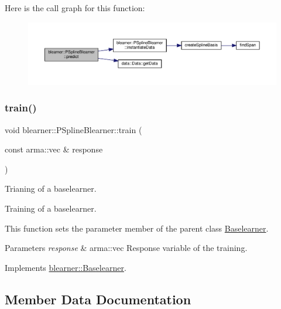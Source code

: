 Here is the call graph for this function\+:\nopagebreak
\begin{figure}[H]
\begin{center}
\leavevmode
\includegraphics[width=350pt]{classblearner_1_1_p_spline_blearner_a9d35aeb36c403c167fb7519379825873_cgraph}
\end{center}
\end{figure}
\mbox{\label{classblearner_1_1_p_spline_blearner_aa5c18ceb8396ffce556588486d574be8}} 
\subsubsection{\texorpdfstring{train()}{train()}}
{\footnotesize\ttfamily void blearner\+::\+P\+Spline\+Blearner\+::train (\begin{DoxyParamCaption}\item[{const arma\+::vec \&}]{response }\end{DoxyParamCaption})\hspace{0.3cm}{\ttfamily [virtual]}}



Trianing of a baselearner. 

Training of a baselearner.

This function sets the {\ttfamily parameter} member of the parent class {\ttfamily \mbox{\hyperlink{classblearner_1_1_baselearner}{Baselearner}}}.


\begin{DoxyParams}{Parameters}
{\em response} & {\ttfamily arma\+::vec} Response variable of the training. \\
\hline
\end{DoxyParams}


Implements \mbox{\hyperlink{classblearner_1_1_baselearner_a40e03ad070b9a03aae706d9ee8094b80}{blearner\+::\+Baselearner}}.



\subsection{Member Data Documentation}
\mbox{\label{classblearner_1_1_p_spline_blearner_a0f01c6609befd8af4d5a44f22293ba55}} 
